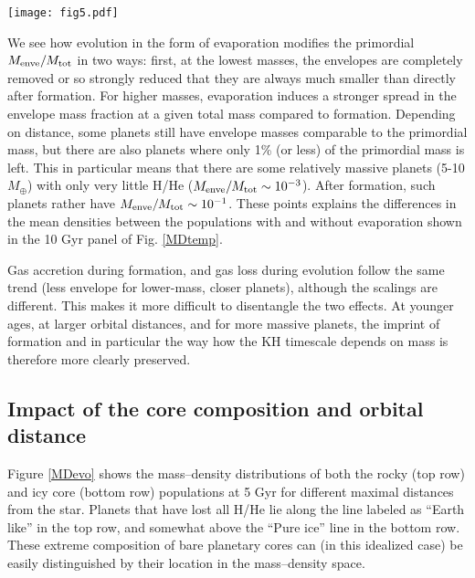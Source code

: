 \documentclass[]{emulateapj}
\def\mearth{M_{\oplus}}
\begin{document}
\begin{figure*}
 \texttt{[image: fig5.pdf]}
 \caption{Planetary mass vs. mean density of the rocky (top row) and icy core (bottom row) populations at 5 Gyr for different orbital distances. The color of each point shows the fraction of the initial envelope that was evaporated. The black points are planets that have lost all their initial envelope. The orange and green dashed lines show the density curves of Earth-like and pure-ice cores respectively (``icy'' in contrast means 75\% ice). For rocky and icy cores there is a dearth of planets with densities of 3-7 and 1-3  g/cm$^{3}$, respectively, reflecting the different loci of the evaporation valley. With increasing distance, low-mass very low-density planets as well as planets in the evaporation valley appear.  }
  \label{MDevo}
\end{figure*}

We see how evolution in the form of evaporation modifies the primordial $M_{\rm enve}/M_{\rm tot}$ in two ways:  first, at the lowest masses, the envelopes are completely removed or so strongly reduced that they are always much smaller than directly after formation. For higher masses, evaporation induces a stronger spread in the envelope mass fraction at a given total mass compared to formation. Depending on distance, some planets still have envelope masses comparable to the primordial mass, but there are also planets where only 1\% (or less) of the primordial mass is left. This in particular means that there are some relatively massive planets (5-10 $\mearth$) with only very little H/He ($M_{\rm enve}/M_{\rm tot}\sim10^{-3}$). After formation, such planets rather have $M_{\rm enve}/M_{\rm tot}\sim10^{-1}$.  These points explains the differences in the mean densities between the populations with and without evaporation shown in the 10 Gyr panel of Fig. \ref{MDtemp}. 

Gas accretion during formation, and gas loss during evolution follow the same trend (less envelope for lower-mass, closer planets), although the scalings are different. This makes it more difficult to disentangle the two effects. At younger ages, at larger orbital distances, and for more massive planets, the imprint of formation and in particular the way how the KH timescale depends on mass is therefore more clearly preserved.

\subsection{Impact of the core composition and orbital distance}
Figure \ref{MDevo} shows the mass--density distributions of both the rocky (top row) and icy core (bottom row)  populations at 5 Gyr for different maximal distances from the star.  Planets that have lost all H/He lie along  the line labeled as ``Earth like'' in the top row, and somewhat above the ``Pure ice'' line in the bottom row. These extreme composition of bare planetary cores can (in this idealized case) be easily distinguished by their location in the mass--density space.
\end{document}
